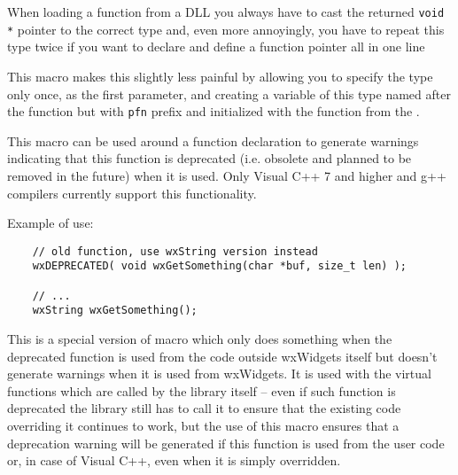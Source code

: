 When loading a function from a DLL you always have to cast the returned
{\tt void *} pointer to the correct type and, even more annoyingly, you have to
repeat this type twice if you want to declare and define a function pointer all
in one line

This macro makes this slightly less painful by allowing you to specify the
type only once, as the first parameter, and creating a variable of this type
named after the function but with {\tt pfn} prefix and initialized with the
function  from the 
.







\label{wxdeprecated}

This macro can be used around a function declaration to generate warnings
indicating that this function is deprecated (i.e. obsolete and planned to be
removed in the future) when it is used. Only Visual C++ 7 and higher and g++
compilers currently support this functionality.

Example of use:
\begin{verbatim}
    // old function, use wxString version instead
    wxDEPRECATED( void wxGetSomething(char *buf, size_t len) );

    // ...
    wxString wxGetSomething();
\end{verbatim}


\label{wxdeprecatedbutusedinternally}

This is a special version of  macro which
only does something when the deprecated function is used from the code outside
wxWidgets itself but doesn't generate warnings when it is used from wxWidgets.
It is used with the virtual functions which are called by the library itself --
even if such function is deprecated the library still has to call it to ensure
that the existing code overriding it continues to work, but the use of this
macro ensures that a deprecation warning will be generated if this function is
used from the user code or, in case of Visual C++, even when it is simply
overridden.


